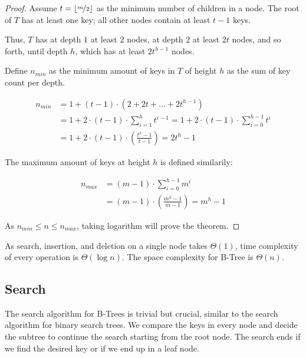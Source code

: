 \begin{proof}
  Assume $t = \lfloor\nicefrac{m}{2}\rfloor$ as the minimum number of children in a node. The root of $T$ has at least one key; all other nodes contain at least $t - 1$ keys.

  Thus, $T$ has at depth $1$ at least $2$ nodes, at depth $2$ at least $2t$ nodes, and so forth, until depth $h$, which has at least $2t^{h-1}$ nodes.

  Define $n_{min}$ as the minimum amount of keys in $T$ of height $h$ as the sum of key count per depth.

  \begin{equation}
    \begin{split}
      n_{min} & = 1 + (t - 1) \cdot (2 + 2t + \dots + 2t^{h-1}) \\
      &= 1 + 2 \cdot (t - 1) \cdot \sum^{h}_{i = 1}{t^{i-1}} = 1 + 2 \cdot (t - 1) \cdot \sum^{h - 1}_{i = 0}{t^{i}} \\
      &= 1 + 2 \cdot (t - 1) \cdot (\frac{t^h - 1}{t - 1}) = 2t^h - 1
    \end{split}
  \end{equation}

  The maximum amount of keys at height $h$ is defined similarily:

  \begin{equation}
    \begin{split}
      n_{max} & = (m - 1) \cdot \sum^{h - 1}_{i = 0}{m^i} \\
      &= (m - 1) \cdot (\frac{m^h - 1}{m - 1}) = m^h - 1
    \end{split}
  \end{equation}

  As $n_{min} \le n \le n_{max}$, taking logarithm will prove the theorem.
\end{proof}

As search, insertion, and deletion on a single node takes $\Theta{(1)}$, time complexity of every operation is $\Theta{(\log{n})}$. The space complexity for B-Tree is $\Theta{(n)}$.

\subsection{Search}

The search algorithm for B-Trees is trivial but crucial, similar to the search algorithm for binary search trees. We compare the keys in every node and decide the subtree to continue the search starting from the root node. The search ends if we find the desired key or if we end up in a leaf node.

